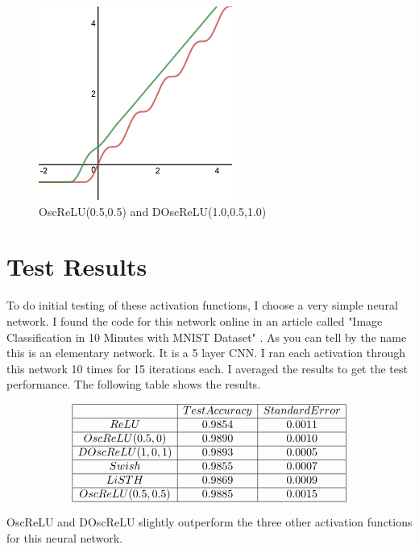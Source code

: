 \documentclass{amsart}
\theoremstyle{definition}
\theoremstyle{remark}
\numberwithin{equation}{section}
\newcommand{\blankbox}[2]{%
  \parbox{\columnwidth}{\centering
    \setlength{\fboxsep}{0pt}%
    \fbox{\raisebox{0pt}[#2]{\hspace{#1}}}%
  }%
}
\begin{document}
\begin{figure}[!h]
\includegraphics[1]{Inhib.png}
\caption{OscReLU(0.5,0.5) and DOscReLU(1.0,0.5,1.0)}
\label{Figure 10}
\end{figure} 

\section{Test Results}   

To do initial testing of these activation functions, I choose a very simple neural network.  I found the code for this network online in an article called  "Image Classification in 10 Minutes with MNIST Dataset" \cite{D}. As you can tell by the name this is an elementary network. It is a 5 layer CNN. I ran each activation through this network 10 times for 15 iterations each.  I averaged the results to get the test performance.  The following table shows the results.  

\begin{table}[!h]
\renewcommand\arraystretch{1.5}
\noindent\[
\begin{array}{|c|c|c|}
\hline
 & Test Accuracy & Standard Error\\
\hline
ReLU & 0.9854 & 0.0011\\
\hline
OscReLU(0.5,0) & 0.9890 &  0.0010\\
\hline
DOscReLU(1,0,1) & 0.9893 & 0.0005\\
\hline
Swish & 0.9855 & 0.0007\\
\hline 
LiSTH & 0.9869 & 0.0009 \\
\hline
OscReLU(0.5,0.5) & 0.9885 & 0.0015 \\
\hline
\end{array}
\]
\end{table}

OscReLU and DOscReLU slightly outperform the three other activation functions for this neural network. 
\end{document}
